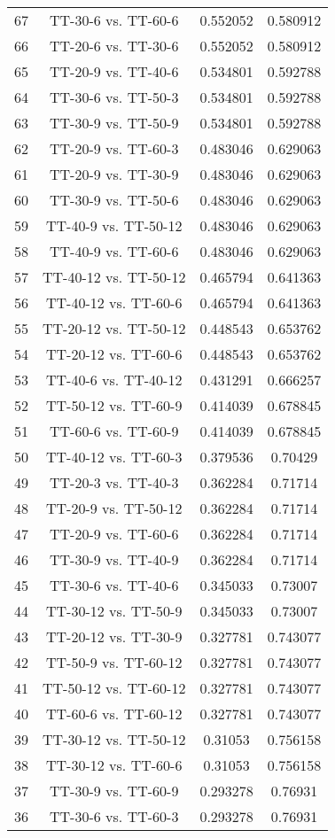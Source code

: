 \documentclass[a4paper,10pt]{article}
\begin{document}
\begin{landscape}
\begin{table}[!htp]
\begin{tabular}{cccc}
67&TT-30-6 vs. TT-60-6&0.552052&0.580912\\
66&TT-20-6 vs. TT-30-6&0.552052&0.580912\\
65&TT-20-9 vs. TT-40-6&0.534801&0.592788\\
64&TT-30-6 vs. TT-50-3&0.534801&0.592788\\
63&TT-30-9 vs. TT-50-9&0.534801&0.592788\\
62&TT-20-9 vs. TT-60-3&0.483046&0.629063\\
61&TT-20-9 vs. TT-30-9&0.483046&0.629063\\
60&TT-30-9 vs. TT-50-6&0.483046&0.629063\\
59&TT-40-9 vs. TT-50-12&0.483046&0.629063\\
58&TT-40-9 vs. TT-60-6&0.483046&0.629063\\
57&TT-40-12 vs. TT-50-12&0.465794&0.641363\\
56&TT-40-12 vs. TT-60-6&0.465794&0.641363\\
55&TT-20-12 vs. TT-50-12&0.448543&0.653762\\
54&TT-20-12 vs. TT-60-6&0.448543&0.653762\\
53&TT-40-6 vs. TT-40-12&0.431291&0.666257\\
52&TT-50-12 vs. TT-60-9&0.414039&0.678845\\
51&TT-60-6 vs. TT-60-9&0.414039&0.678845\\
50&TT-40-12 vs. TT-60-3&0.379536&0.70429\\
49&TT-20-3 vs. TT-40-3&0.362284&0.71714\\
48&TT-20-9 vs. TT-50-12&0.362284&0.71714\\
47&TT-20-9 vs. TT-60-6&0.362284&0.71714\\
46&TT-30-9 vs. TT-40-9&0.362284&0.71714\\
45&TT-30-6 vs. TT-40-6&0.345033&0.73007\\
44&TT-30-12 vs. TT-50-9&0.345033&0.73007\\
43&TT-20-12 vs. TT-30-9&0.327781&0.743077\\
42&TT-50-9 vs. TT-60-12&0.327781&0.743077\\
41&TT-50-12 vs. TT-60-12&0.327781&0.743077\\
40&TT-60-6 vs. TT-60-12&0.327781&0.743077\\
39&TT-30-12 vs. TT-50-12&0.31053&0.756158\\
38&TT-30-12 vs. TT-60-6&0.31053&0.756158\\
37&TT-30-9 vs. TT-60-9&0.293278&0.76931\\
36&TT-30-6 vs. TT-60-3&0.293278&0.76931\\

\end{tabular}
\end{table}
\end{landscape}
\end{document}
